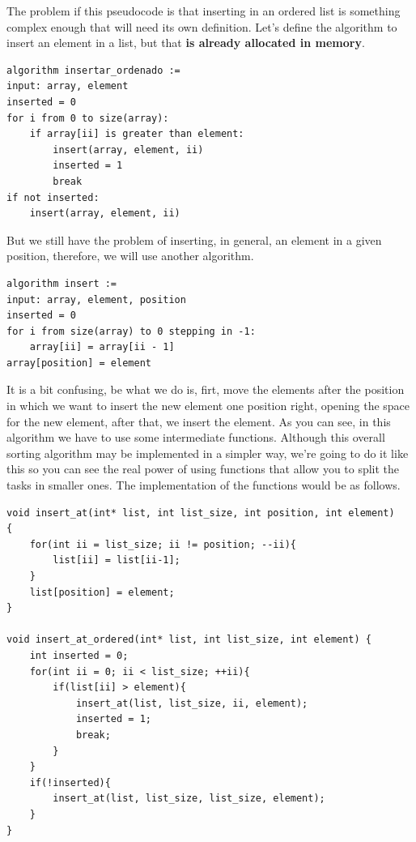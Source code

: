 \documentclass[a4paper]{article}
\begin{document}
The problem if this pseudocode is that inserting in an ordered list is something
complex enough that will need its own definition. Let's define the algorithm to
insert an element in a list, but that \textbf{is already allocated in memory}.

\noindent
\begin{minipage}[H]{\linewidth}
\mbox{}
\begin{lstlisting}[style=pseudoCode]
algorithm insertar_ordenado :=
input: array, element
inserted = 0
for i from 0 to size(array):
    if array[ii] is greater than element:
        insert(array, element, ii)
        inserted = 1
        break
if not inserted:
    insert(array, element, ii)
\end{lstlisting}
\end{minipage}

But we still have the problem of inserting, in general, an element in a given
position, therefore, we will use another algorithm.

\noindent
\begin{minipage}[H]{\linewidth}
\mbox{}
\begin{lstlisting}[style=pseudoCode]
algorithm insert :=
input: array, element, position
inserted = 0
for i from size(array) to 0 stepping in -1:
    array[ii] = array[ii - 1]
array[position] = element
\end{lstlisting}
\end{minipage}

It is a bit confusing, be what we do is, firt, move the elements after the
position in which we want to insert the new element one position right, opening
the space for the new element, after that, we insert the element. As you can
see, in this algorithm we have to use some intermediate functions. Although this
overall sorting algorithm may be implemented in a simpler way, we're going to
do it like this so you can see the real power of using functions that allow you
to split the tasks in smaller ones. The implementation of the functions would
be as follows.

\noindent
\begin{minipage}[H]{\linewidth}
\mbox{}
\begin{lstlisting}[style=C,
caption={Auxiliary algorithms for insertion sort},
label={lst:insertionAuxiliar}]
void insert_at(int* list, int list_size, int position, int element)
{
    for(int ii = list_size; ii != position; --ii){
        list[ii] = list[ii-1];
    }
    list[position] = element;
}

void insert_at_ordered(int* list, int list_size, int element) {
    int inserted = 0;
    for(int ii = 0; ii < list_size; ++ii){
        if(list[ii] > element){
            insert_at(list, list_size, ii, element);
            inserted = 1;
            break;
        }
    }
    if(!inserted){
        insert_at(list, list_size, list_size, element);
    }
}
\end{lstlisting}
\end{minipage}
\end{document}
